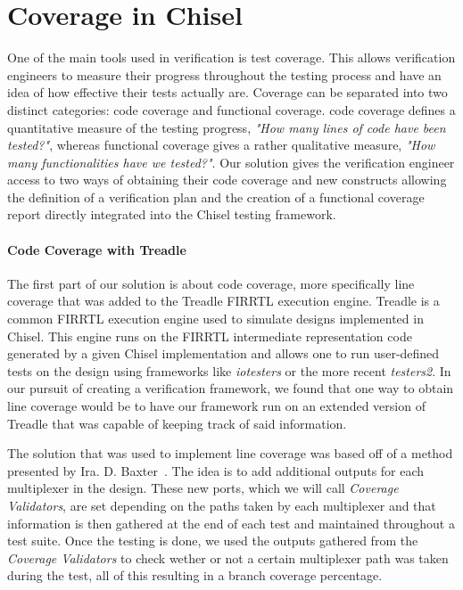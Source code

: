 \documentclass[runningheads]{llncs}
\newcommand{\martin}[1]{{\color{blue} Martin: #1}}
\renewcommand{\martin}[1]{}
\begin{document}
\section{Coverage in Chisel}

\martin{This is probably already contained in the coverage paper and can be removed here.}

One of the main tools used in verification is test coverage. This allows verification engineers to measure their progress throughout the testing process and have an idea of how effective their tests actually are. Coverage can be separated into two distinct categories: code coverage and functional coverage. code coverage defines a quantitative measure of the testing progress, \textit{"How many lines of code have been tested?"}, whereas functional coverage gives a rather qualitative measure, \textit{"How many functionalities have we tested?"}.  Our solution gives the verification engineer access to two ways of obtaining their code coverage and new constructs allowing the definition of a verification plan and the creation of a functional coverage report directly integrated into the Chisel testing framework.

\paragraph{Code Coverage with Treadle}  
The first part of our solution is about code coverage, more specifically line coverage that was added to the Treadle FIRRTL execution engine. Treadle is a common FIRRTL execution engine used to simulate designs implemented in Chisel. This engine runs on the FIRRTL intermediate representation code generated by a given Chisel implementation and allows one to run user-defined tests on the design using frameworks like \textit{iotesters} or the more recent \textit{testers2}. In our pursuit of creating a verification framework, we found that one way to obtain line coverage would be to have our framework run on an extended version of Treadle that was capable of keeping track of said information.

The solution that was used to implement line coverage was based off of a method presented by Ira. D. Baxter~\cite{branch-cov-made-easy:2002}. The idea is to add additional outputs for each multiplexer in the design. These new ports, which we will call \textit{Coverage Validators}, are set depending on the paths taken by each multiplexer and that information is then gathered at the end of each test and maintained throughout a test suite. Once the testing is done, we used the outputs gathered from the \textit{Coverage Validators} to check wether or not a certain multiplexer path was taken during the test, all of this resulting in a branch coverage percentage.
\end{document}
